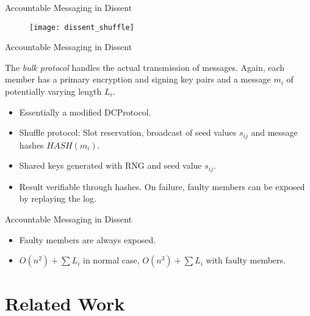 \documentclass[]{beamer} %
\begin{document}
\begin{frame}{Accountable Messaging in Dissent}

\begin{figure}[h!]
\centering
\texttt{[image: dissent\_shuffle]}
\end{figure}

\end{frame}

\begin{frame}{Accountable Messaging in Dissent}

The \emph{bulk protocol} handles the actual transmission of messages. Again, each member has
a primary encryption and signing key pairs and a message $m_i$ of potentially varying length
$L_i$. 

\begin{itemize}
\item Essentially a modified \ac{DCProtocol}.
\item Shuffle protocol: Slot reservation, broadcast of seed values $s_{ij}$
      and message hashes $HASH(m_i)$.
\item Shared keys generated with RNG and seed value $s_{ij}$.
\item Result verifiable through hashes. On failure, faulty members can be exposed
      by replaying the log. %
\end{itemize}

\end{frame}

\begin{frame}{Accountable Messaging in Dissent}

\begin{itemize}
\item Faulty members are always exposed.
\item $O(n^2) + \sum L_i$ in normal case, $O(n^3) + \sum L_i$ with faulty members.
\end{itemize}

\end{frame}

\section{Related Work}
\end{document}

